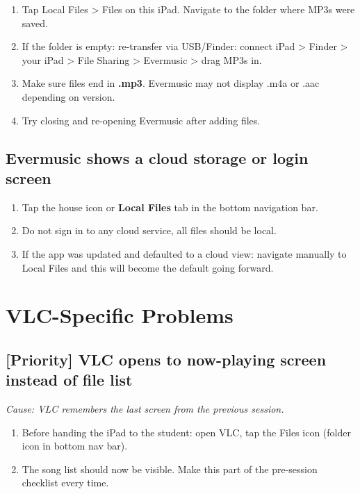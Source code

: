 \documentclass[justified,openright]{tufte-book}
\begin{document}
\begin{enumerate}
\item
  Tap Local Files \textgreater{} Files on this iPad. Navigate to the
  folder where MP3s were saved.
\item
  If the folder is empty: re-transfer via USB/Finder: connect iPad
  \textgreater{} Finder \textgreater{} your iPad \textgreater{} File
  Sharing \textgreater{} Evermusic \textgreater{} drag MP3s in.
\item
  Make sure files end in \textbf{.mp3}. Evermusic may not display .m4a
  or .aac depending on version.
\item
  Try closing and re-opening Evermusic after adding files.
\end{enumerate}

\subsection{Evermusic shows a cloud storage or login
screen}\label{evermusic-shows-a-cloud-storage-or-login-screen}

\begin{enumerate}
\item
  Tap the house icon or \textbf{Local Files} tab in the bottom
  navigation bar.
\item
  Do not sign in to any cloud service, all files should be local.
\item
  If the app was updated and defaulted to a cloud view: navigate
  manually to Local Files and this will become the default going
  forward.
\end{enumerate}

\section{VLC-Specific Problems}\label{vlc-specific-problems}

\subsection{[Priority] VLC opens to now-playing screen instead of file
list}\label{vlc-opens-to-now-playing-screen-instead-of-file-list}

\emph{Cause: VLC remembers the last screen from the previous session.}

\begin{enumerate}
\item
  Before handing the iPad to the student: open VLC, tap the Files icon
  (folder icon in bottom nav bar).
\item
  The song list should now be visible. Make this part of the pre-session
  checklist every time.
\end{enumerate}
\end{document}
